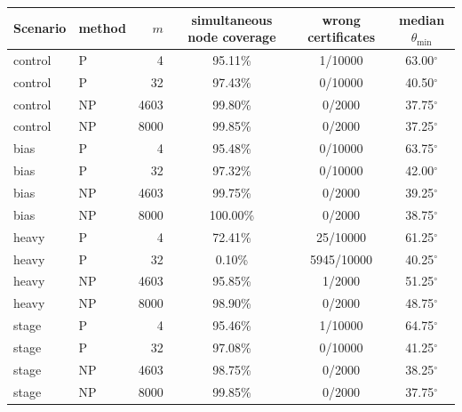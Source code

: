 \begin{tabular}{llrccc}
\toprule
Scenario & method & $m$ & simultaneous node coverage & wrong certificates & median $\theta_{\min}$ \\
\midrule
control & P & 4 & 95.11\% & 1/10000 & 63.00$^\circ$ \\
control & P & 32 & 97.43\% & 0/10000 & 40.50$^\circ$ \\
control & NP & 4603 & 99.80\% & 0/2000 & 37.75$^\circ$ \\
control & NP & 8000 & 99.85\% & 0/2000 & 37.25$^\circ$ \\
bias & P & 4 & 95.48\% & 0/10000 & 63.75$^\circ$ \\
bias & P & 32 & 97.32\% & 0/10000 & 42.00$^\circ$ \\
bias & NP & 4603 & 99.75\% & 0/2000 & 39.25$^\circ$ \\
bias & NP & 8000 & 100.00\% & 0/2000 & 38.75$^\circ$ \\
heavy & P & 4 & 72.41\% & 25/10000 & 61.25$^\circ$ \\
heavy & P & 32 & 0.10\% & 5945/10000 & 40.25$^\circ$ \\
heavy & NP & 4603 & 95.85\% & 1/2000 & 51.25$^\circ$ \\
heavy & NP & 8000 & 98.90\% & 0/2000 & 48.75$^\circ$ \\
stage & P & 4 & 95.46\% & 1/10000 & 64.75$^\circ$ \\
stage & P & 32 & 97.08\% & 0/10000 & 41.25$^\circ$ \\
stage & NP & 4603 & 98.75\% & 0/2000 & 38.25$^\circ$ \\
stage & NP & 8000 & 99.85\% & 0/2000 & 37.75$^\circ$ \\
\bottomrule
\end{tabular}
